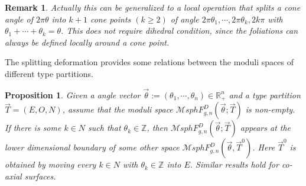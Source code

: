 \documentclass[pdflatex,sn-mathphys]{sn-jnl}%
\numberwithin{equation}{section}
\theoremstyle{thmstyleone}%
\newtheorem{proposition}[theorem]{Proposition}%
\newtheorem{remark}[theorem]{Remark}%
\newcommand{\RR}{\mathbb{R}}
\newcommand{\ZZ}{\mathbb{Z}}
\newcommand{\MsphDF}[3]{\mathcal{M}sphF_{#1,#2}^D(#3)}
\newcommand{\MsphgnDFT}{\mathcal{M}sphF_{g,n}^D(\vec{\theta};\vec{T})}
\newcommand{\PRB}{\textcolor{brown}}
\begin{document}
\begin{remark}
    Actually this can be generalized to a local operation that splits a cone angle of $2\pi\theta$ into $k+1$ cone points $(k\geq2)$ of angle $2\pi\theta_1, \cdots, 2\pi\theta_k, 2k\pi$ with $\theta_1+\cdots +\theta_k = \theta$. This does not require dihedral condition, since the foliations can always be defined locally around a cone point.
\end{remark}


The splitting deformation provides some relations between the moduli spaces of different type partitions. 
\begin{proposition}\label{prop:low_dim_bd}
    Given a angle vector $\vec{\theta}:=(\theta_1, \cdots, \theta_n) \in \RR^n_+$ and a type partition $\vec{T}=( E, O, N )$, assume that the moduli space $\MsphgnDFT$ is non-empty. If there is some $k\in N$ such that $\theta_k\in\ZZ$, then $\MsphgnDFT$ appears at the lower dimensional boundary of some other space $\MsphDF{g}{n}{\vec{\theta},\vec{T}^0}$. Here $\vec{T}^0$ is obtained by moving every $k\in N$ with $\theta_k \in \ZZ$ into $E$. Similar results hold for co-axial surfaces.
\end{proposition}
\end{document}

